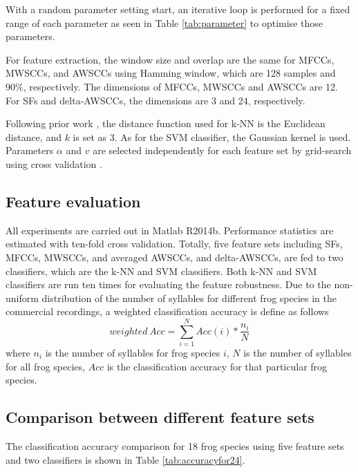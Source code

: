 With a random parameter setting start, an iterative loop is performed for a fixed range of each parameter as seen in Table \ref{tab:parameter} to optimise those parameters.

For feature extraction, the window size and overlap are the same for MFCCs, MWSCCs, and AWSCCs using Hamming window, which are 128 samples and 90\%, respectively. The dimensions of MFCCs, MWSCCs and AWSCCs are 12. For SFs and delta-AWSCCs, the dimensions are 3 and 24, respectively.

Following prior work \citep{huang2009frog, han2011acoustic, Xie1504:Acoustic}, the distance function used for k-NN is the Euclidean distance, and $k$ is set as 3. As for the SVM classifier, the Gaussian kernel is used. Parameters $\alpha$ and $v$ are selected independently for each feature set by grid-search using cross validation \citep{hsu2003practical}. 

\subsection{Feature evaluation}
All experiments are carried out in Matlab R2014b. Performance statistics are estimated with ten-fold cross validation. Totally, five feature sets including SFs, MFCCs, MWSCCs, and averaged AWSCCs, and delta-AWSCCs, are fed to two classifiers, which are the k-NN and SVM classifiers. Both k-NN and SVM classifiers are run ten times for evaluating the feature robustness. Due to the non-uniform distribution of the number of syllables for different frog species in the commercial recordings, a weighted classification accuracy is define as follows
\begin{equation}
weighted \, Acc=\sum_{i=1}^{N}Acc(i)*\frac{n_{i}}{N}
\end{equation}
\noindent where $n_{i}$ is the number of syllables for frog species $i$, $N$ is the number of syllables for all frog species, $Acc$ is the classification accuracy for that particular frog species. 


\subsection{Comparison between different feature sets}
The classification accuracy comparison for 18 frog species using five feature sets and two classifiers is shown in Table \ref{tab:accuracyfor24}. 


